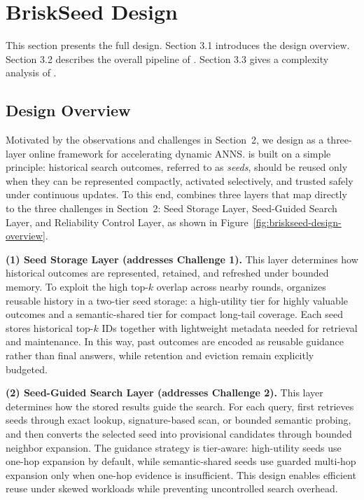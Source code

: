 \section{BriskSeed Design}
\label{sec:briskseed-design}

This section presents the full \system design.
Section 3.1 introduces the design overview.
Section 3.2 describes the overall pipeline of \system.
Section 3.3 gives a complexity analysis of \system.

\subsection{Design Overview}


Motivated by the observations and challenges in Section~2, we design \textbf{\system} as a three-layer online framework for accelerating dynamic ANNS. 
\system is built on a simple principle: historical search outcomes, referred to as \emph{seeds}, should be reused only when they can be represented compactly, activated selectively, and trusted safely under continuous updates. 
To this end, \system combines three layers that map directly to the three challenges in Section~2: Seed Storage Layer, Seed-Guided Search Layer, and Reliability Control Layer, as shown in Figure~\ref{fig:briskseed-design-overview}.

\noindent\textbf{(1) Seed Storage Layer (addresses Challenge 1).}
This layer determines how historical outcomes are represented, retained, and refreshed under bounded memory. 
To exploit the high top-$k$ overlap across nearby rounds, \system organizes reusable history in a two-tier seed storage: a high-utility tier for highly valuable outcomes and a semantic-shared tier for compact long-tail coverage. 
Each seed stores historical top-$k$ IDs together with lightweight metadata needed for retrieval and maintenance. 
In this way, past outcomes are encoded as reusable guidance rather than final answers, while retention and eviction remain explicitly budgeted.

\noindent\textbf{(2) Seed-Guided Search Layer (addresses Challenge 2).}
This layer determines how the stored results guide the search. 
For each query, \system first retrieves seeds through exact lookup, signature-based scan, or bounded semantic probing, and then converts the selected seed into provisional candidates through bounded neighbor expansion. 
The guidance strategy is tier-aware: high-utility seeds use one-hop expansion by default, while semantic-shared seeds use guarded multi-hop expansion only when one-hop evidence
is insufficient.
This design enables efficient reuse under skewed workloads while preventing uncontrolled search overhead.

